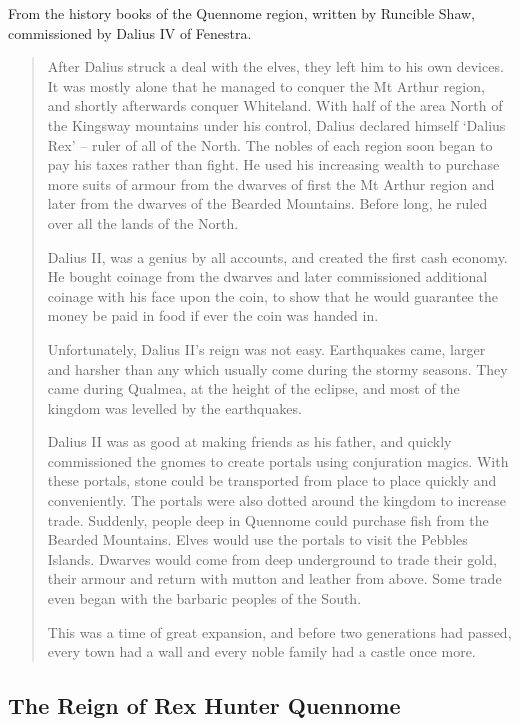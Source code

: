 \begin{multicols}{2}
From the history books of the Quennome region, written by Runcible Shaw, commissioned by Dalius IV of Fenestra.

\begin{quotation}

	After Dalius struck a deal with the elves, they left him to his own devices.
	It was mostly alone that he managed to conquer the Mt Arthur region, and shortly afterwards conquer Whiteland.
	With half of the area North of the Kingsway mountains under his control, Dalius declared himself `Dalius Rex' -- ruler of all of the North.
	The nobles of each region soon began to pay his taxes rather than fight.
	He used his increasing wealth to purchase more suits of armour from the dwarves of first the Mt Arthur region and later from the dwarves of the Bearded Mountains.
	Before long, he ruled over all the lands of the North.

	Dalius II, was a genius by all accounts, and created the first cash economy.
	He bought coinage from the dwarves and later commissioned additional coinage with his face upon the coin, to show that he would guarantee the money be paid in food if ever the coin was handed in.

	Unfortunately, Dalius II's reign was not easy.
	Earthquakes came, larger and harsher than any which usually come during the stormy seasons.
	They came during Qualmea, at the height of the eclipse, and most of the kingdom was levelled by the earthquakes.

	Dalius II was as good at making friends as his father, and quickly commissioned the gnomes to create portals using conjuration magics.
	With these portals, stone could be transported from place to place quickly and conveniently.
	The portals were also dotted around the kingdom to increase trade.
	Suddenly, people deep in Quennome could purchase fish from the Bearded Mountains.
	Elves would use the portals to visit the Pebbles Islands.
	Dwarves would come from deep underground to trade their gold, their armour and return with mutton and leather from above.
	Some trade even began with the barbaric peoples of the South.

	This was a time of great expansion, and before two generations had passed, every town had a wall and every noble family had a castle once more.

\end{quotation}

\subsection{The Reign of Rex Hunter Quennome}


\end{multicols}
